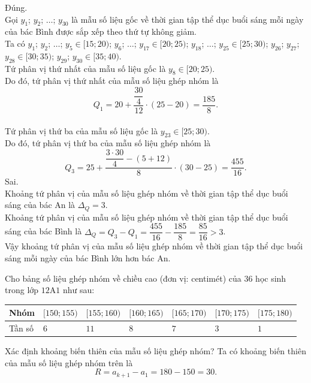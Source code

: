 \begin{ex}
{\begin{itemchoice}
			\itemch Đúng. \\
			Gọi $y_1$; $y_2$; $\ldots$; $y_{30}$ là mẫu số liệu gốc về thời gian tập thể dục buổi sáng mỗi ngày của bác Bình được sắp xếp theo thứ tự không giảm. \\
			Ta có $y_1$; $y_2$; $\ldots$; $y_5 \in [15; 20)$; $y_6$; $\ldots$; $y_{17} \in [20; 25)$; $y_{18}$; $\ldots$; $y_{25} \in [25; 30)$; $y_{26}$; $y_{27}$; $y_{28} \in [30; 35)$; $y_{29}$; $y_{30} \in [35; 40)$.\\
			Tứ phân vị thứ nhất của mẫu số liệu gốc là $y_8 \in [20; 25)$. \\
			Do đó, tứ phân vị thứ nhất của mẫu số liệu ghép nhóm là 
			\[Q_1 = 20 + \dfrac{\dfrac{30}{4}}{12} \cdot (25 - 20) = \dfrac{185}{8}.\] \\
			Tứ phân vị thứ ba của mẫu số liệu gốc là $y_{23} \in [25; 30)$. \\
			Do đó, tứ phân vị thứ ba của mẫu số liệu ghép nhóm là 
			\[Q_3 = 25 + \dfrac{\dfrac{3 \cdot 30}{4} - (5 + 12) }{8} \cdot (30 - 25) = \dfrac{455}{16}.\] 
			\itemch Sai.\\
			 Khoảng tứ phân vị của mẫu số liệu ghép nhóm về thời gian tập thể dục buổi sáng của bác An là $\Delta_Q = 3$. \\
			 Khoảng tứ phân vị của mẫu số liệu ghép nhóm về thời gian tập thể dục buổi sáng của bác Bình là $\Delta_Q = Q_3 - Q_1 = \dfrac{455}{16} - \dfrac{185}{8} = \dfrac{85}{16} > 3$. \\
			 Vậy khoảng tứ phân vị của mẫu số liệu ghép nhóm về thời gian tập thể dục buổi sáng mỗi ngày của bác Bình lớn hơn bác An.
		\end{itemchoice}
	}
\end{ex}

\begin{bt}%
	Cho bảng số liệu ghép nhóm về chiều cao (đơn vị: centimét) của $36$ học sinh trong lớp $12$A$1$ như sau:
	\begin{center}
		\begin{tabular}{|>{\centering\arraybackslash}m{2cm}|>{\centering\arraybackslash}m{2cm}|>{\centering\arraybackslash}m{2cm}|>{\centering\arraybackslash}m{2cm}|>{\centering\arraybackslash}m{2cm}|>{\centering\arraybackslash}m{2cm}|>{\centering\arraybackslash}m{2cm}|}
			\hline
			Nhóm & $[150; 155)$ & $[155; 160)$ & $[160; 165)$ & $[165; 170)$ & $[170; 175)$ & $[175; 180)$  \\ \hline
			Tần số & $6$ & $11$ & $8$ & $7$ & $3$ & $1$ \\ \hline
		\end{tabular}
	\end{center}
	Xác định khoảng biến thiên của mẫu số liệu ghép nhóm?
\loigiai
{ Ta có khoảng biến thiên của mẫu số liệu ghép nhóm trên là
	\[R = a_{k + 1} - a_1 = 180 - 150 = 30.\]
}
\end{bt}

